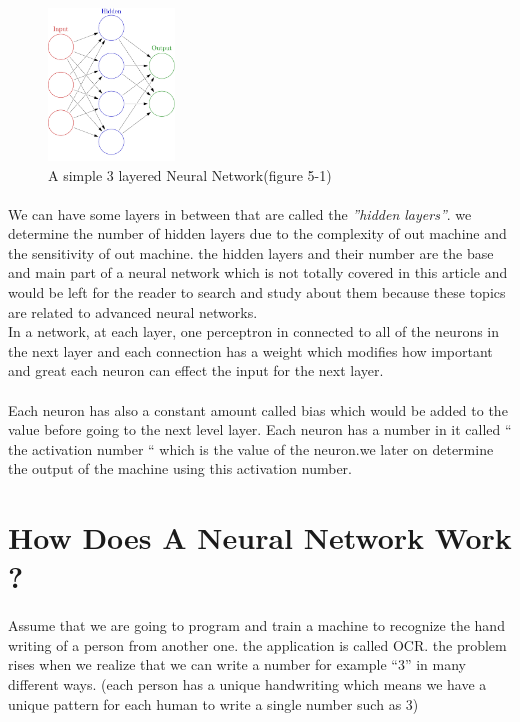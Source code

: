 \documentclass[12pt , a4paper]{article}
\begin{document}
\begin{figure}[h]
\centering
\includegraphics[width=0.3\textwidth,frame]{nn.png}
\caption*{A simple 3 layered Neural Network(figure 5-1)}
\label{f-5-1}
\end{figure}

\paragraph{} We can have some layers in between that are called the \textit{''hidden layers''}. we determine the number of hidden layers due to the complexity of out machine and the sensitivity of out machine. the hidden layers and their number are the base and main part of a neural network which is not totally covered in this article and would be left for the reader to search and study about them because these topics are related to advanced neural networks. \\
In a network, at each layer, one perceptron in connected to all of the neurons in the next layer and each connection has a weight which modifies how important and great each neuron can effect the input for the next layer. \\
\paragraph{} Each neuron has also a constant amount called bias which would be added to the value before going to the next level layer. Each neuron has a number in it called “ the activation number “ which is the value of the neuron.we later on determine the output of the machine using this activation number. 
\section { How Does A Neural Network Work ? }
\paragraph{} Assume that we are going to program and train a machine to recognize the hand writing of a person from another one. the application is called OCR. the problem rises when we realize that we can write a number for example “3” in many different ways. (each person has a unique handwriting which means we have a unique pattern for each human to write a single number such as 3)\\
\end{document}
